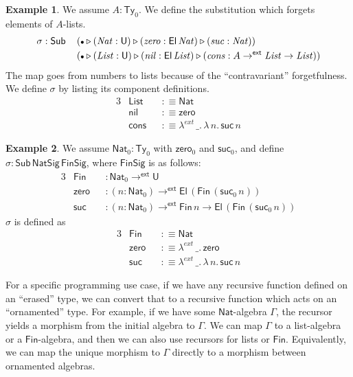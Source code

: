 \documentclass[12pt,a4paper,twoside,openany]{book}
\theoremstyle{remark}
\theoremstyle{definition}
\newtheorem{myexample}{Example}
\theoremstyle{theorem}
\newcommand{\mi}[1]{\mathit{#1}}
\newcommand{\ms}[1]{\mathsf{#1}}
\newcommand{\zero}{\ms{zero}}
\newcommand{\suc}{\ms{suc}}
\newcommand{\Sub}{\mathsf{Sub}}
\newcommand{\Ty}{\mathsf{Ty}}
\newcommand{\U}{\mathsf{U}}
\newcommand{\El}{\mathsf{El}}
\newcommand{\ext}{\triangleright}
\newcommand{\emptycon}{\scaleobj{.75}\bullet}
\newcommand{\toe}{\to^{\ms{ext}}}
\newcommand{\Nat}{\ms{Nat}}
\newcommand{\defn}{:\equiv}
\begin{document}
\begin{myexample}
We assume $A : \Ty_0$. We define the substitution which forgets elements of
$A$-lists.
\begin{alignat*}{3}
  & \sigma : \Sub\,&&
  (\emptycon \ext (\mi{Nat} : \U) \ext (\mi{zero} : \El\,\mi{Nat}) \ext (\mi{suc} : \mi{Nat}))\\
  & &&(\emptycon \ext (\mi{List} : \U) \ext (\mi{nil} : \El\,\mi{List}) \ext (\mi{cons} : A \toe \mi{List} \to \mi{List}))
\end{alignat*}
The map goes from numbers to lists because of the ``contravariant''
forgetfulness. We define $\sigma$ by listing its component definitions.
\begin{alignat*}{3}
  &\ms{List} &&\defn \ms{Nat}\\
  &\ms{nil} &&\defn \ms{zero}\\
  &\ms{cons} &&\defn \lambda^{ext}\,\_.\,\lambda\,n.\,\ms{suc}\,n
\end{alignat*}
\end{myexample}

\begin{myexample}
  We assume $\Nat_0 : \Ty_0$ with $\zero_0$ and $\suc_0$, and define $\sigma : \Sub\,\ms{NatSig}\,\ms{FinSig}$, where $\ms{FinSig}$ is as follows:
\begin{alignat*}{3}
  &\ms{Fin}  &&: \Nat_0 \toe \U\\
  &\ms{zero} &&: (n : \Nat_0) \toe \El\,(\ms{Fin}\,(\suc_0\,n))\\
  &\ms{suc}  &&: (n : \Nat_0) \toe \ms{Fin}\,n \to \El\,(\ms{Fin}\,(\suc_0\,n))
\end{alignat*}
$\sigma$ is defined as
\begin{alignat*}{3}
  &\ms{Fin}  &&\defn \ms{Nat}\\
  &\ms{zero} &&\defn \lambda^{ext}\,\_.\,\ms{zero}\\
  &\ms{suc}  &&\defn \lambda^{ext}\,\_.\,\lambda\,n.\,\ms{suc}\,n
\end{alignat*}
\end{myexample}
For a specific programming use case, if we have any recursive function defined
on an ``erased'' type, we can convert that to a recursive function which acts on
an ``ornamented'' type. For example, if we have some $\Nat$-algebra $\Gamma$,
the recursor yields a morphism from the initial algebra to $\Gamma$. We can map
$\Gamma$ to a list-algebra or a $\ms{Fin}$-algebra, and then we can also use
recursors for lists or $\ms{Fin}$. Equivalently, we can map the unique morphism
to $\Gamma$ directly to a morphism between ornamented algebras.
\end{document}
